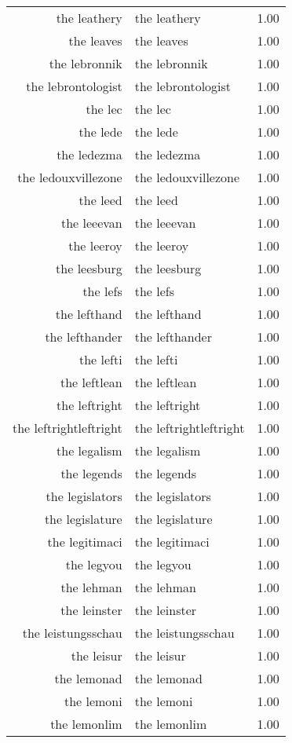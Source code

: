 \begin{table}[ht]
\begin{tabular}{rlr}
  the leathery & the leathery & 1.00 \\ 
  the leaves & the leaves & 1.00 \\ 
  the lebronnik & the lebronnik & 1.00 \\ 
  the lebrontologist & the lebrontologist & 1.00 \\ 
  the lec & the lec & 1.00 \\ 
  the lede & the lede & 1.00 \\ 
  the ledezma & the ledezma & 1.00 \\ 
  the ledouxvillezone & the ledouxvillezone & 1.00 \\ 
  the leed & the leed & 1.00 \\ 
  the leeevan & the leeevan & 1.00 \\ 
  the leeroy & the leeroy & 1.00 \\ 
  the leesburg & the leesburg & 1.00 \\ 
  the lefs & the lefs & 1.00 \\ 
  the lefthand & the lefthand & 1.00 \\ 
  the lefthander & the lefthander & 1.00 \\ 
  the lefti & the lefti & 1.00 \\ 
  the leftlean & the leftlean & 1.00 \\ 
  the leftright & the leftright & 1.00 \\ 
  the leftrightleftright & the leftrightleftright & 1.00 \\ 
  the legalism & the legalism & 1.00 \\ 
  the legends & the legends & 1.00 \\ 
  the legislators & the legislators & 1.00 \\ 
  the legislature & the legislature & 1.00 \\ 
  the legitimaci & the legitimaci & 1.00 \\ 
  the legyou & the legyou & 1.00 \\ 
  the lehman & the lehman & 1.00 \\ 
  the leinster & the leinster & 1.00 \\ 
  the leistungsschau & the leistungsschau & 1.00 \\ 
  the leisur & the leisur & 1.00 \\ 
  the lemonad & the lemonad & 1.00 \\ 
  the lemoni & the lemoni & 1.00 \\ 
  the lemonlim & the lemonlim & 1.00 \\ 

\end{tabular}
\end{table}
